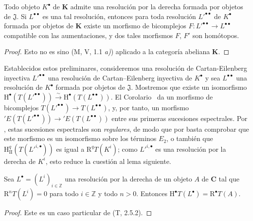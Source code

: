 \begin{corollary}[11.5.2.2]
\label{0.11.5.2.2}
\label{0.11.5.2.2-fr}
Todo objeto $K^\bullet$ de $\boldsymbol{K}$ admite una resolución por la derecha formada por objetos de $\mathfrak J$.
Si $L^{\bullet\bullet}$ es una tal resolución, entonces para toda resolución $L'^{\bullet\bullet}$ de $K^\bullet$ formada por objetos de $\boldsymbol{K}$ existe un morfismo de bicomplejos
$F:L'^{\bullet\bullet}\to L^{\bullet\bullet}$ compatible con las aumentaciones, y dos tales morfismos $F$, $F'$ son homótopos.
\end{corollary}

\begin{proof}
Esto no es sino (M, V, 1.1 \emph{a)}) aplicado a la categoría abeliana
$\boldsymbol{K}$.
\end{proof}

\begin{env}[11.5.2.3]
\label{0.11.5.2.3-fr}
Establecidos estos preliminares, consideremos una resolución de Cartan-Eilenberg inyectiva $L'^{\bullet\bullet}$ una resolución de Cartan--Eilenberg inyectiva de $K^\bullet$ y sea $L^{\bullet\bullet}$ una resolución de $K^\bullet$ formada por objetos de $\mathfrak J$.
Mostremos que existe un isomorfismo
$\mathrm H^\bullet(T(L'^{\bullet\bullet}))\xrightarrow{\sim}\mathrm H^\bullet(T(L^{\bullet\bullet}))$.
El Corolario~ da un morfismo de bicomplejos
$T(L'^{\bullet\bullet})\to T(L^{\bullet\bullet})$,
y, por tanto, un morfismo
$'E(T(L'^{\bullet\bullet}))\to{}'E(T(L^{\bullet\bullet}))$
entre sus primeras sucesiones espectrales.
Por , estas sucesiones espectrales son \emph{regulares}, de modo que por  basta comprobar que este morfismo es un isomorfismo sobre los términos $E_2$, o también que
$\mathrm H_{\mathrm{II}}^q(T(L'^{i,\bullet}))$ es igual a
$\mathrm R^qT(K^i)$; como $L'^{i,\bullet}$ es una resolución por la derecha de $K^i$, esto reduce la cuestión al lema siguiente.
\end{env}

\begin{lemma}[11.5.2.4]
\label{0.11.5.2.4}
\label{0.11.5.2.4-fr}
Sea $L^\bullet=(L^i)_{i\in\mathbb Z}$ una resolución por la derecha de un objeto $A$ de $\boldsymbol{C}$ tal que $\mathrm R^nT(L^i)=0$ para todo $i\in\mathbb Z$ y todo $n>0$.
Entonces
$\mathrm H^\bullet T(L^\bullet)=\mathrm R^\bullet T(A)$.
\end{lemma}

\begin{proof}
Este es un caso particular de (T, 2.5.2).
\end{proof}

